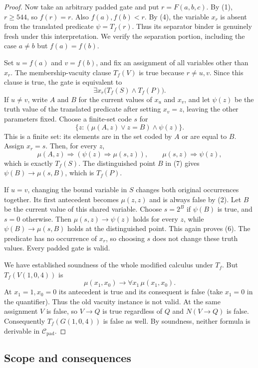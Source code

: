 \begin{proof}
Now take an arbitrary padded gate and put $r=F(a,b,c)$.
By (1), $r\ge544$, so $f(r)=r$. Also $f(a),f(b)<r$.
By (4), the variable $x_r$ is absent from the translated predicate
$\psi=T_f(r)$. Thus its separator binder is genuinely fresh under
this interpretation. We verify the separation portion, including the
case $a\ne b$ but $f(a)=f(b)$.

Set $u=f(a)$ and $v=f(b)$, and fix an assignment of all variables
other than $x_r$. The membership-vacuity clause $T_f(V)$ is true
because $r\ne u,v$. Since this clause is true, the gate is equivalent
to
\[
 \exists x_r\bigl(T_f(S)\wedge T_f(P)\bigr).
 \tag{6}
\]
If $u\ne v$, write $A$ and $B$ for the current values of $x_u$
and $x_v$, and let $\psi(z)$ be the truth value of the translated
predicate after setting $x_v=z$, leaving the other parameters fixed.
Choose a finite-set code $s$ for
\[
 \{z:(\mu(A,z)\lor z=B)\wedge\psi(z)\}.
 \tag{7}
\]
This is a finite set: its elements are in the set coded by $A$ or
are equal to $B$. Assign $x_r=s$. Then, for every $z$,
\[
 \mu(A,z)\Longrightarrow(\psi(z)\Longrightarrow\mu(s,z)),
 \qquad \mu(s,z)\Longrightarrow\psi(z),
\]
which is exactly $T_f(S)$. The distinguished point $B$ in (7) gives
$\psi(B)\to\mu(s,B)$, which is $T_f(P)$.

If $u=v$, changing the bound variable in $S$ changes both original
occurrences together. Its first antecedent becomes $\mu(z,z)$ and
is always false by (2). Let $B$ be the current value of this shared
variable. Choose $s=2^B$ if $\psi(B)$ is true, and $s=0$ otherwise.
Then $\mu(s,z)\to\psi(z)$ holds for every $z$, while
$\psi(B)\to\mu(s,B)$ holds at the distinguished point. This again
proves (6). The predicate has no occurrence of $x_r$, so choosing
$s$ does not change these truth values. Every padded gate is valid.

We have established soundness of the whole modified calculus under
$T_f$. But $T_f(V(1,0,4))$ is
\[
 \mu(x_1,x_0)\to\forall x_1\,\mu(x_1,x_0).
\]
At $x_1=1,x_0=0$ its antecedent is true and its consequent is false
(take $x_1=0$ in the quantifier). Thus the old vacuity instance is
not valid. At the same assignment $V$ is false, so $V\to Q$ is true
regardless of $Q$ and $N(V\to Q)$ is false. Consequently
$T_f(G(1,0,4))$ is false as well. By soundness, neither formula is
derivable in $\mathcal C_{\mathrm{pad}}$.
\end{proof}

\subsection{Scope and consequences}

